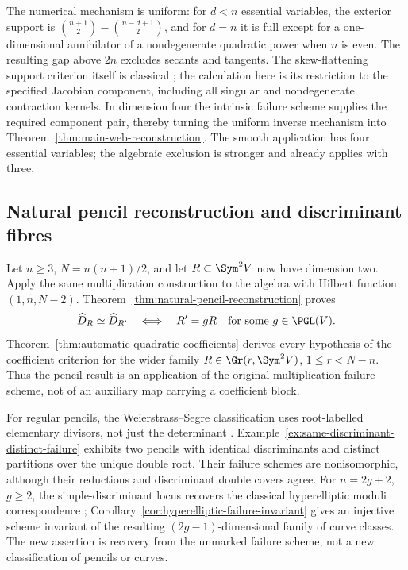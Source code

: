 The numerical mechanism is uniform: for \(d<n\) essential variables,
the exterior support is
\(\binom{n+1}{2}-\binom{n-d+1}{2}\), and for \(d=n\) it is full
except for a one-dimensional annihilator of a nondegenerate quadratic
power when \(n\) is even.  The resulting gap above \(2n\) excludes
secants and tangents.  The skew-flattening support criterion itself
is classical \cite{LandsbergOttaviani,Sheridan}; the calculation here
is its restriction to the specified Jacobian component, including
all singular and nondegenerate contraction kernels.  In dimension
four the intrinsic failure scheme supplies the required component
pair, thereby turning the uniform inverse mechanism into
Theorem~\ref{thm:main-web-reconstruction}.  The smooth application
has four essential variables; the algebraic exclusion is stronger
and already applies with three.

\subsection{Natural pencil reconstruction and discriminant fibres}

Let \(n\ge3\), \(N=n(n+1)/2\), and let
\(R\subset\Sym^2V\) now have dimension two.  Apply the same
multiplication construction to the algebra with Hilbert function
\((1,n,N-2)\).  Theorem~\ref{thm:natural-pencil-reconstruction}
proves
\[
 \widehat D_R\simeq\widehat D_{R'}\quad\Longleftrightarrow\quad
                  R'=gR\quad\text{for some }g\in\PGL(V).
\]
Theorem~\ref{thm:automatic-quadratic-coefficients} derives every
hypothesis of the coefficient criterion for the wider family
\(R\in\Gr(r,\Sym^2V)\), \(1\le r<N-n\).  Thus the
pencil result is an application of the original multiplication
failure scheme, not of an auxiliary map carrying a coefficient block.

For regular pencils, the Weierstrass--Segre classification uses
root-labelled elementary divisors, not just the determinant
\cite[Theorem~1.1 and Corollary~2.1]{FevolaMandelshtamSturmfels}.
Example~\ref{ex:same-discriminant-distinct-failure} exhibits two
pencils with identical discriminants and distinct partitions over
the unique double root.  Their failure schemes are nonisomorphic,
although their reductions and discriminant double covers agree.
For \(n=2g+2\), \(g\ge2\), the simple-discriminant locus
recovers the classical hyperelliptic moduli correspondence
\cite[\S4.2]{SmithQuadrics};
Corollary~\ref{cor:hyperelliptic-failure-invariant} gives an
injective scheme invariant of the resulting \((2g-1)\)-dimensional
family of curve classes.  The new assertion is recovery from the
unmarked failure scheme, not a new classification of pencils or curves.


